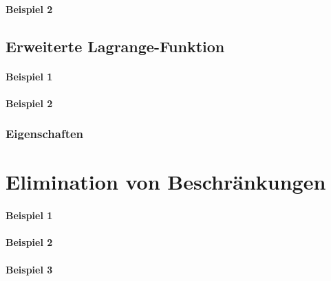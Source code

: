             \paragraph{Beispiel 2} %

        \subsection{Erweiterte Lagrange-Funktion} %

            \paragraph{Beispiel 1} %

            \paragraph{Beispiel 2} %

            \subsubsection{Eigenschaften} %

    \section{Elimination von Beschränkungen} %

        \paragraph{Beispiel 1} %

        \paragraph{Beispiel 2} %

        \paragraph{Beispiel 3} %

